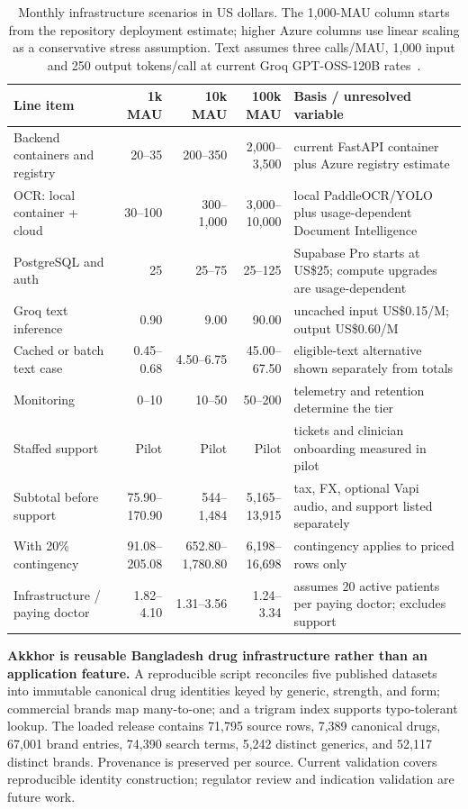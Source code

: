 \documentclass[12pt,twocolumn,a4paper]{article}
\begin{document}
\begin{table}[!t]
\caption{Monthly infrastructure scenarios in US dollars. The 1,000-MAU column starts from
the repository deployment estimate; higher Azure columns use linear scaling as a
conservative stress assumption. Text assumes three calls/MAU, 1,000 input
and 250 output tokens/call at current Groq GPT-OSS-120B rates~\cite{groq}.}
\label{tab:cost}
\centering
\scriptsize
\setlength{\tabcolsep}{3pt}
\begin{tabularx}{\textwidth}{@{}p{3.15cm}rrrY@{}}
\toprule
Line item & 1k MAU & 10k MAU & 100k MAU & Basis / unresolved variable \\
\midrule
Backend containers and registry & 20--35 & 200--350 & 2,000--3,500 & current FastAPI container plus Azure registry estimate \\
OCR: local container + cloud & 30--100 & 300--1,000 & 3,000--10,000 & local PaddleOCR/YOLO plus usage-dependent Document Intelligence \\
PostgreSQL and auth & 25 & 25--75 & 25--125 & Supabase Pro starts at US\$25; compute upgrades are usage-dependent~\cite{supabasepricing} \\
Groq text inference & 0.90 & 9.00 & 90.00 & uncached input US\$0.15/M; output US\$0.60/M \\
Cached or batch text case & 0.45--0.68 & 4.50--6.75 & 45.00--67.50 & eligible-text alternative shown separately from totals \\
Monitoring & 0--10 & 10--50 & 50--200 & telemetry and retention determine the tier \\
Staffed support & Pilot & Pilot & Pilot & tickets and clinician onboarding measured in pilot \\
Subtotal before support & 75.90--170.90 & 544--1,484 & 5,165--13,915 & tax, FX, optional Vapi audio, and support listed separately \\
With 20\% contingency & 91.08--205.08 & 652.80--1,780.80 & 6,198--16,698 & contingency applies to priced rows only \\
Infrastructure / paying doctor & 1.82--4.10 & 1.31--3.56 & 1.24--3.34 & assumes 20 active patients per paying doctor; excludes support \\
\bottomrule
\end{tabularx}
\end{table}

\textbf{Akkhor is reusable Bangladesh drug infrastructure rather than an application
feature.} A reproducible script reconciles five published datasets into immutable canonical
drug identities keyed by generic, strength, and form; commercial brands map many-to-one;
and a trigram index supports typo-tolerant lookup. The loaded release contains 71,795 source
rows, 7,389 canonical drugs, 67,001 brand entries, 74,390 search terms, 5,242 distinct
generics, and 52,117 distinct brands. Provenance is preserved per source. Current validation
covers reproducible identity construction; regulator review and indication validation are
future work.
\end{document}
